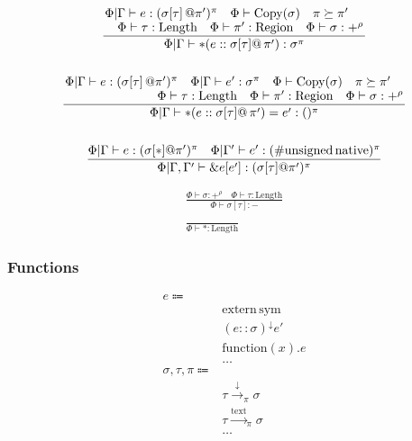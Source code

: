 \documentclass {article}
\begin{document}
\begin{gather*}
\frac
{\splitfrac{\Phi | \Gamma \vdash e : (\sigma [\tau] \, @ \pi')^\pi \quad \Phi \vdash \text{Copy} (\sigma) \quad \pi \succeq \pi'}
{\Phi \vdash \tau : \text{Length} \quad \Phi \vdash \pi' : \text{Region} \quad \Phi \vdash \sigma : +^{\rho}}}
{\Phi | \Gamma \vdash * (e :: \sigma [\tau] @ \, {\pi'})  : \sigma^\pi} \\
\\
\frac
{\splitfrac{\Phi | \Gamma \vdash e : (\sigma [\tau] \, @ \pi')^\pi \quad \Phi | \Gamma \vdash e' : \sigma^\pi  \quad \Phi \vdash \text{Copy} (\sigma) \quad \pi \succeq \pi'}
{\Phi \vdash \tau : \text{Length} \quad \Phi \vdash \pi' : \text{Region} \quad \Phi \vdash \sigma : +^{\rho}}}
{\Phi | \Gamma \vdash *(e :: \sigma [\tau] @ \,{\pi'}) = e' : ()^\pi } \\
\\
\frac
{\Phi | \Gamma \vdash e : (\sigma [*] @ \pi')^\pi \quad \Phi |
 \Gamma' \vdash e' : (\#\text{unsigned} \, \text{native})^\pi}
{\Phi | \Gamma, \Gamma' \vdash \&e [e'] : (\sigma [\tau] @  \pi')^\pi} 
\end{gather*}

\begin{gather*}
\frac
{\Phi \vdash \sigma : +^{\rho} \quad \Phi \vdash \tau : \text{Length}}
{\Phi \vdash \sigma [\tau] : -} \\
\\
\frac
{}
{\Phi \vdash * : \text{Length}}
\end{gather*}

\subsubsection{Functions}

\begin{align*}
e \Coloneqq & \\
& \text{extern} \, \text{sym} \tag{Extern Function} \\
& (e :: \sigma) ^\downarrow e' \tag{Function Pointer Application} \\
& \text{function} (x). e \tag{Function Literal} \\
& \dots \\
\sigma, \tau, \pi \Coloneqq & \\
& \tau \xrightarrow{\downarrow}_\pi \sigma \tag{Function Pointer}\\
& \tau \xrightarrow{\text{text}}_\pi \sigma  \tag{Function Literal Type} \\
& \dots
\end{align*}
\end{document}
